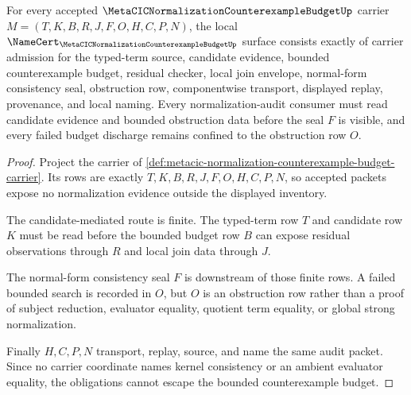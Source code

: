 \begin{theorem}
\label{thm:metacic-normalization-counterexample-budget-obligations}
For every accepted $\MetaCICNormalizationCounterexampleBudgetUp$ carrier $M=(T,K,B,R,J,F,O,H,C,P,N)$, the local $\NameCert_{\MetaCICNormalizationCounterexampleBudgetUp}$ surface consists exactly of carrier admission for the typed-term source, candidate evidence, bounded counterexample budget, residual checker, local join envelope, normal-form consistency seal, obstruction row, componentwise transport, displayed replay, provenance, and local naming. Every normalization-audit consumer must read candidate evidence and bounded obstruction data before the seal $F$ is visible, and every failed budget discharge remains confined to the obstruction row $O$.
\end{theorem}
\begin{proof}
Project the carrier of \autoref{def:metacic-normalization-counterexample-budget-carrier}. Its rows are exactly $T,K,B,R,J,F,O,H,C,P,N$, so accepted packets expose no normalization evidence outside the displayed inventory.

The candidate-mediated route is finite. The typed-term row $T$ and candidate row $K$ must be read before the bounded budget row $B$ can expose residual observations through $R$ and local join data through $J$.

The normal-form consistency seal $F$ is downstream of those finite rows. A failed bounded search is recorded in $O$, but $O$ is an obstruction row rather than a proof of subject reduction, evaluator equality, quotient term equality, or global strong normalization.

Finally $H,C,P,N$ transport, replay, source, and name the same audit packet. Since no carrier coordinate names kernel consistency or an ambient evaluator equality, the obligations cannot escape the bounded counterexample budget.
\end{proof}




